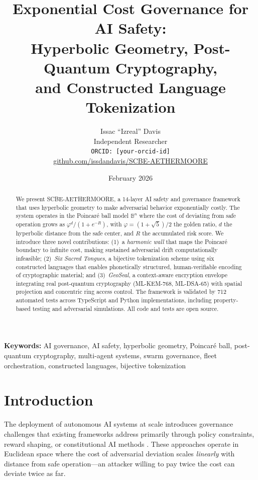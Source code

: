 \documentclass[11pt,a4paper]{article}
\title{%
  \textbf{Exponential Cost Governance for AI Safety:\\
  Hyperbolic Geometry, Post-Quantum Cryptography,\\
  and Constructed Language Tokenization}
}
\author{
  Issac ``Izreal'' Davis\\
  Independent Researcher\\
  \texttt{ORCID: [your-orcid-id]}\\
  \href{https://github.com/issdandavis/SCBE-AETHERMOORE}{github.com/issdandavis/SCBE-AETHERMOORE}
}
\date{February 2026}
\newcommand{\BB}{\mathbb{B}}
\newcommand{\golden}{\varphi}
\begin{document}
\maketitle

\begin{abstract}
We present SCBE-AETHERMOORE, a 14-layer AI safety and governance framework
that uses hyperbolic geometry to make adversarial behavior exponentially
costly. The system operates in the Poincar\'{e} ball model $\BB^n$ where
the cost of deviating from safe operation grows as $\golden^d / (1 + e^{-R})$,
with $\golden = (1+\sqrt{5})/2$ the golden ratio, $d$ the hyperbolic distance
from the safe center, and $R$ the accumulated risk score. We introduce three
novel contributions: (1)~a \emph{harmonic wall} that maps the Poincar\'{e}
boundary to infinite cost, making sustained adversarial drift computationally
infeasible; (2)~\emph{Six Sacred Tongues}, a bijective tokenization scheme
using six constructed languages that enables phonetically structured,
human-verifiable encoding of cryptographic material; and (3)~\emph{GeoSeal},
a context-aware encryption envelope integrating real post-quantum cryptography
(ML-KEM-768, ML-DSA-65) with spatial projection and concentric ring access
control. The framework is validated by 712 automated tests across TypeScript
and Python implementations, including property-based testing and adversarial
simulations. All code and tests are open source.
\end{abstract}

\noindent\textbf{Keywords:} AI governance, AI safety, hyperbolic geometry,
Poincar\'{e} ball, post-quantum cryptography, multi-agent systems,
swarm governance, fleet orchestration, constructed languages, bijective
tokenization

\section{Introduction}
\label{sec:intro}

The deployment of autonomous AI systems at scale introduces governance
challenges that existing frameworks address primarily through policy
constraints, reward shaping, or constitutional AI methods
\cite{bai2022constitutional, christiano2017deep}. These approaches
operate in Euclidean space where the cost of adversarial deviation
scales \emph{linearly} with distance from safe operation---an attacker
willing to pay twice the cost can deviate twice as far.
\end{document}
